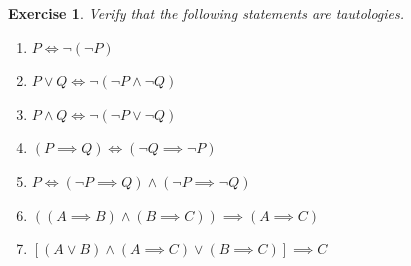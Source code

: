 \documentclass{article}[12pt]
\newtheorem{exercise}{Exercise}[section]
\begin{document}
            \begin{exercise}
                Verify that the following statements are tautologies.
                
                \begin{multicols}{2}
                \begin{enumerate}
                    \item
                    $P \iff \neg (\neg P)$
                    
                    \item 
                    $P \lor Q  \iff \neg (\neg P \land \neg Q)$
                    
                    \item
                    $P \land Q \iff \neg (\neg P \lor \neg Q)$
                    
                    \item\label{eqn:contraposition}
                    $(P \implies Q) \iff (\neg Q \implies \neg P)$
                    
                    \item \label{eqn:contradiction}
                    $P \iff (\neg P \implies Q) \land (\neg P \implies \neg Q)$
                    
                    \item
                    $((A \implies B) \land (B \implies C)) \implies (A \implies C)$
                    
                    \item\label{eqn:pf-cases}
                    $[(A \lor B) \land (A \implies C) \lor (B \implies C)] \implies C$

                \end{enumerate}
                \end{multicols}
                
            \end{exercise}
            
            
            
\end{document}

